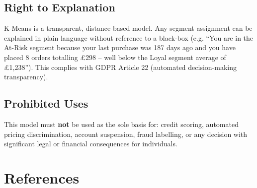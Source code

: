 \documentclass[12pt,a4paper]{report}
\begin{document}
\section{Right to Explanation}

K-Means is a transparent, distance-based model. Any segment assignment can be explained in plain language without reference to a black-box (e.g. ``You are in the At-Risk segment because your last purchase was 187 days ago and you have placed 8 orders totalling £298 -- well below the Loyal segment average of £1,238''). This complies with GDPR Article 22 (automated decision-making transparency).

\section{Prohibited Uses}

This model must \textbf{not} be used as the sole basis for: credit scoring, automated pricing discrimination, account suspension, fraud labelling, or any decision with significant legal or financial consequences for individuals.

\chapter{References}
\end{document}
